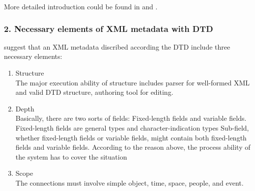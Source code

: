 \documentclass[a4paper]{article} %
\begin{document}
	More detailed introduction could be found in {\bf\cite{1:1:1}} and {\bf\cite{Rachel:2009:reviewofmetadataformats}}.
	
	
	\subsubsection*{2. Necessary elements of XML metadata with DTD}
	\label{sec:mets}
	{\bf\cite{Ruey-Shun:2003:DevelopinganXMLframeworkformetadatasystem}} suggest that an XML metadata discribed according the DTD include three necessary elements:
	\begin{enumerate}
		\item Structure\\
		The major execution ability of structure includes parser for well-formed XML and
		valid DTD structure, authoring tool for editing.
		
		\item Depth\\
		Basically, there are two sorts of fields: Fixed-length fields and variable fields.
		Fixed-length fields are general types and character-indication types Sub-field, whether
		fixed-length fields or variable fields, might contain both fixed-length fields and
		variable fields. According to the reason above, the process ability of the system has to
		cover the situation
		
		\item Scope\\
		The connections must involve simple object, time, space, people, and event. 
	\end{enumerate}
	
	
	
\end{document}
